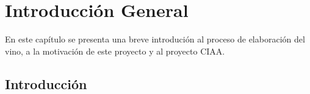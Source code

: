 
\chapter{Introducción General} %

\label{Chapter1} %
\label{IntroGeneral}

En este capítulo se presenta una breve introdución al proceso de elaboración del vino,  a la motivación de este proyecto y al proyecto CIAA. 


\newcommand{\keyword}[1]{\textbf{#1}}
\newcommand{\tabhead}[1]{\textbf{#1}}
\newcommand{\code}[1]{\texttt{#1}}
\newcommand{\file}[1]{\texttt{\bfseries#1}}
\newcommand{\option}[1]{\texttt{\itshape#1}}
\newcommand{\grados}{$^{\circ}$}


\section{Introducción}


